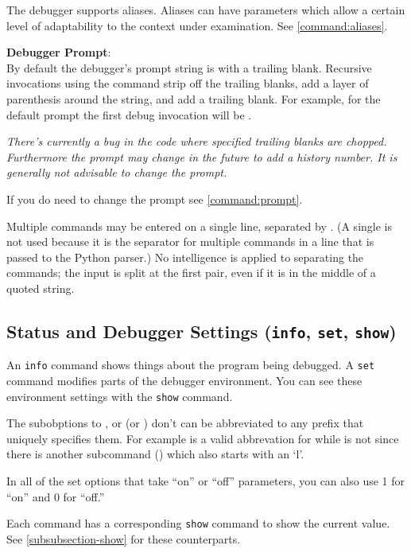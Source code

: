 The debugger supports aliases.  Aliases can have parameters which
allow a certain level of adaptability to the context under
examination. See \ref{command:aliases}.

{\bf Debugger Prompt}:\label{debugger:prompt}\\
By default the debugger's prompt string is  with 
a trailing blank. Recursive invocations using the
 command strip off the trailing blanks, add a layer of
parenthesis around the string, and add a trailing blank. For example,
for the default prompt the first debug invocation will be
.

\emph{There's currently a bug in the code where specified trailing
blanks are chopped. Furthermore the prompt may change in the future to
add a history number. It is generally not advisable to change the
prompt.}

If you do need to change the prompt see \ref{command:prompt}.

Multiple commands may be entered on a single line, separated by
\samp{;;}.  (A single \samp{;} is not used because it is
the separator for multiple commands in a line that is passed to
the Python parser.)
No intelligence is applied to separating the commands;
the input is split at the first \samp{;;} pair, even if it is in
the middle of a quoted string.

\subsection{Status and Debugger Settings ({\tt info}, {\tt set}, {\tt show})\label{subsection-status}}

An {\tt info} command shows things about the program being debugged. A
{\tt set} command modifies parts of the debugger environment. You can
see these environment settings with the {\tt show} command.

The subobptions to , or  (or ) don't
can be abbreviated to any prefix that uniquely specifies them. For
example  is a valid abbrevation for 
while  is not since there is another subcommand
() which also starts with an `l'.

In all of the set options that take ``on'' or ``off'' parameters, you
can also use 1 for ``on'' and 0 for ``off.''

Each command has a corresponding {\tt show} command to show the current
value. See \ref{subsubsection-show} for these counterparts.

